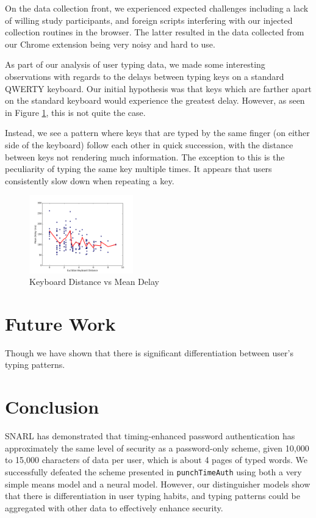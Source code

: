 \documentclass[9pt,journal]{IEEEtran}
\begin{document}
On the data collection front, we experienced expected challenges including a lack of willing study participants, and foreign scripts interfering with our injected collection routines in the browser. The latter resulted in the data collected from our Chrome extension being very noisy and hard to use.

As part of our analysis of user typing data, we made some interesting observations with regards to the delays between typing keys on a standard QWERTY keyboard. Our initial hypothesis was that keys which are farther apart on the standard keyboard would experience the greatest delay. However, as seen in Figure \ref{fig:keyboard}, this is not quite the case.

Instead, we see a pattern where keys that are typed by the same finger (on either side of the keyboard) follow each other in quick succession, with the distance between keys not rendering much information. The exception to this is the peculiarity of typing the same key multiple times. It appears that users consistently slow down when repeating a key.

\begin{figure}[H]
  \centering
  \includegraphics[width=0.4\textwidth]{keyboard}
  \caption{Keyboard Distance vs Mean Delay}
  \label{fig:keyboard}
\end{figure}


\section{Future Work}

Though we have shown that there is significant differentiation between user's typing patterns.

\section{Conclusion}

SNARL has demonstrated that timing-enhanced password authentication has approximately the same level of security as a password-only scheme, given 10,000 to 15,000 characters of data per user, which is about 4 pages of typed words. We successfully defeated the scheme presented in \texttt{punchTimeAuth} using both a very simple means model and a neural model. However, our distinguisher models show that there is differentiation in user typing habits, and typing patterns could be aggregated with other data to effectively enhance security.

\pagebreak
\printbibliography
\end{document}
